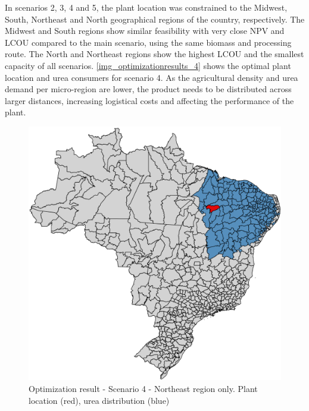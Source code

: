\documentclass[a4paper, titlepage]{article}
\begin{document}
In scenarios 2, 3, 4 and 5, the plant location was constrained to the Midwest, South, Northeast and North
geographical regions of the country, respectively. The Midwest and South regions show similar feasibility with very
close NPV and LCOU compared to the main scenario, using the same biomass and processing route. The North and Northeast
regions show the highest LCOU and the smallest capacity of all scenarios. \autoref{img_optimizationresults_4} shows the
optimal plant location and urea consumers for scenario 4. As the agricultural density and urea demand per micro-region
are lower, the product needs to be distributed across larger distances, increasing logistical costs and affecting the
performance of the plant.

\begin{figure}[htb]
    \includegraphics[width=\textwidth]{img/optimization_result_4.png}
    \caption{Optimization result - Scenario 4 - Northeast region only. Plant location (red), urea distribution (blue)}
    \label{img_optimizationresults_4}
\end{figure}
\end{document}
